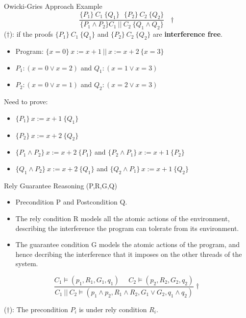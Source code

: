 \documentclass[11pt]{beamer}
\begin{document}
\begin{frame}{Owicki-Gries Approach Example}
    $$\frac{\{P_1\}~C_1~\{Q_1\}~~~\{P_2\}~C_2~\{Q_2\}}{\{P_1 \land P_2\}
    C_1~||~C_2~\{Q_1 \land Q_2\}}~~~\dagger $$
  ($\dagger$): if the proofs $\{P_1\}~C_1~\{Q_1\}$ and $\{P_2\}~C_2~\{Q_2\}$ are {\bf interference free}.

  \begin{itemize}
  \item Program: $\{x = 0\}~ x := x + 1 ~||~ x := x + 2 ~\{x = 3\}$
  \item $P_1:  (x = 0 \lor x = 2)$ and $Q_1: (x = 1 \lor x = 3)$
  \item $P_2: (x = 0 \lor x = 1)$ and $Q_2: (x = 2 \lor x = 3)$
  \end{itemize}
\pause
Need to prove:
\begin{itemize}
\item $\{P_1\}~ x := x + 1~ \{Q_1\}$
\item $\{P_2\}~ x := x + 2 ~\{Q_2\}$
  \pause
  \item $\{P_1 \land P_2\}~ x := x + 2 ~\{P_1\} $ and $\{P_2 \land P_1\} ~x := x + 1 ~\{P_2\} $
  \item $\{Q_1 \land P_2\}~ x := x + 2 ~\{Q_1\} $ and  $\{Q_2 \land P_1\}~ x := x + 1 ~\{Q_2\} $
\end{itemize}

\end{frame}

\begin{frame}{Rely Guarantee Reasoning (P,R,G,Q)}
  \begin{itemize}
  \item Precondition P and Postcondition Q.
  \item The rely condition R models all the atomic actions of the environment,
    describing the interference the  program can tolerate from its environment.
  \item The guarantee condition G models the atomic actions of the program, and
    hence decribing the interference that it imposes on the other threads of the system.
  \end{itemize}
  \pause
  $$\frac{C_1 \models (p_1, R_1,G_1,q_1)~~~~~~ C_2 \models (p_2, R_2, G_2, q_2)}{C_1~||~C_2 \models (p_1 \land
    p_2, R_1 \land R_2, G_1 \lor G_2, q_1 \land q_2)} \dagger$$

  ($\dagger$): The precondition $P_i$ is  under rely condition $R_i$.
\end{frame}
\end{document}
